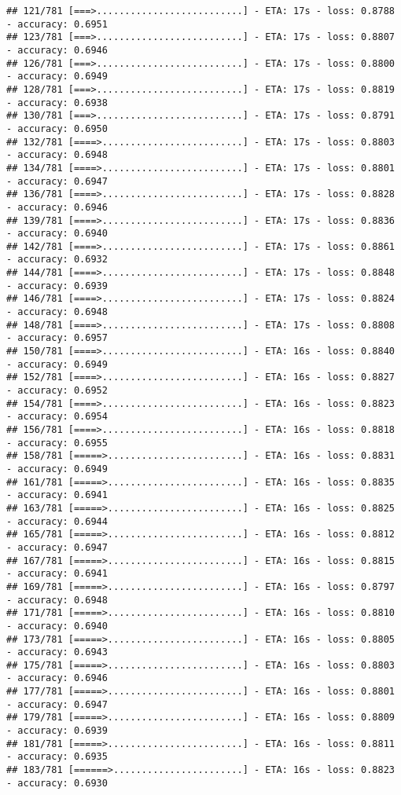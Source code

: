 \documentclass[
]{article}
\begin{document}
\begin{verbatim}
## 121/781 [===>..........................] - ETA: 17s - loss: 0.8788 - accuracy: 0.6951
## 123/781 [===>..........................] - ETA: 17s - loss: 0.8807 - accuracy: 0.6946
## 126/781 [===>..........................] - ETA: 17s - loss: 0.8800 - accuracy: 0.6949
## 128/781 [===>..........................] - ETA: 17s - loss: 0.8819 - accuracy: 0.6938
## 130/781 [===>..........................] - ETA: 17s - loss: 0.8791 - accuracy: 0.6950
## 132/781 [====>.........................] - ETA: 17s - loss: 0.8803 - accuracy: 0.6948
## 134/781 [====>.........................] - ETA: 17s - loss: 0.8801 - accuracy: 0.6947
## 136/781 [====>.........................] - ETA: 17s - loss: 0.8828 - accuracy: 0.6946
## 139/781 [====>.........................] - ETA: 17s - loss: 0.8836 - accuracy: 0.6940
## 142/781 [====>.........................] - ETA: 17s - loss: 0.8861 - accuracy: 0.6932
## 144/781 [====>.........................] - ETA: 17s - loss: 0.8848 - accuracy: 0.6939
## 146/781 [====>.........................] - ETA: 17s - loss: 0.8824 - accuracy: 0.6948
## 148/781 [====>.........................] - ETA: 17s - loss: 0.8808 - accuracy: 0.6957
## 150/781 [====>.........................] - ETA: 16s - loss: 0.8840 - accuracy: 0.6949
## 152/781 [====>.........................] - ETA: 16s - loss: 0.8827 - accuracy: 0.6952
## 154/781 [====>.........................] - ETA: 16s - loss: 0.8823 - accuracy: 0.6954
## 156/781 [====>.........................] - ETA: 16s - loss: 0.8818 - accuracy: 0.6955
## 158/781 [=====>........................] - ETA: 16s - loss: 0.8831 - accuracy: 0.6949
## 161/781 [=====>........................] - ETA: 16s - loss: 0.8835 - accuracy: 0.6941
## 163/781 [=====>........................] - ETA: 16s - loss: 0.8825 - accuracy: 0.6944
## 165/781 [=====>........................] - ETA: 16s - loss: 0.8812 - accuracy: 0.6947
## 167/781 [=====>........................] - ETA: 16s - loss: 0.8815 - accuracy: 0.6941
## 169/781 [=====>........................] - ETA: 16s - loss: 0.8797 - accuracy: 0.6948
## 171/781 [=====>........................] - ETA: 16s - loss: 0.8810 - accuracy: 0.6940
## 173/781 [=====>........................] - ETA: 16s - loss: 0.8805 - accuracy: 0.6943
## 175/781 [=====>........................] - ETA: 16s - loss: 0.8803 - accuracy: 0.6946
## 177/781 [=====>........................] - ETA: 16s - loss: 0.8801 - accuracy: 0.6947
## 179/781 [=====>........................] - ETA: 16s - loss: 0.8809 - accuracy: 0.6939
## 181/781 [=====>........................] - ETA: 16s - loss: 0.8811 - accuracy: 0.6935
## 183/781 [======>.......................] - ETA: 16s - loss: 0.8823 - accuracy: 0.6930

\end{verbatim}
\end{document}
